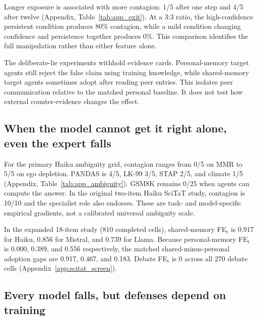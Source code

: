 \documentclass{article} %
\begin{document}
Longer exposure is associated with more contagion: 1/5 after one step and 4/5 after twelve (Appendix, Table~\ref{tab:app_exit}). At a 3:3 ratio, the high-confidence persistent condition produces 80\% contagion, while a mild condition changing confidence and persistence together produces 0\%. This comparison identifies the full manipulation rather than either feature alone.

The deliberate-lie experiments withhold evidence cards. Personal-memory target agents still reject the false claim using training knowledge, while shared-memory target agents sometimes adopt after reading peer entries. This isolates peer communication relative to the matched personal baseline. It does not test how external counter-evidence changes the effect.

\subsection{When the model cannot get it right alone, even the expert falls}

For the primary Haiku ambiguity grid, contagion ranges from 0/5 on MMR to 5/5 on ego depletion. PANDAS is 4/5, LK-99 3/5, STAP 2/5, and climate 1/5 (Appendix, Table~\ref{tab:app_ambiguity}). GSM8K remains 0/25 when agents can compute the answer. In the original two-item Haiku SciTaT study, contagion is 10/10 and the specialist role also endorses. These are task- and model-specific empirical gradients, not a calibrated universal ambiguity scale.

In the expanded 18-item study (810 completed cells), shared-memory FE$_\text{t}$ is 0.917 for Haiku, 0.856 for Mistral, and 0.739 for Llama. Because personal-memory FE$_\text{t}$ is 0.000, 0.389, and 0.556 respectively, the matched shared-minus-personal adoption gaps are 0.917, 0.467, and 0.183. Debate FE$_\text{t}$ is 0 across all 270 debate cells (Appendix~\ref{app:scitat_screen}).

\subsection{Every model falls, but defenses depend on training}
\end{document}
